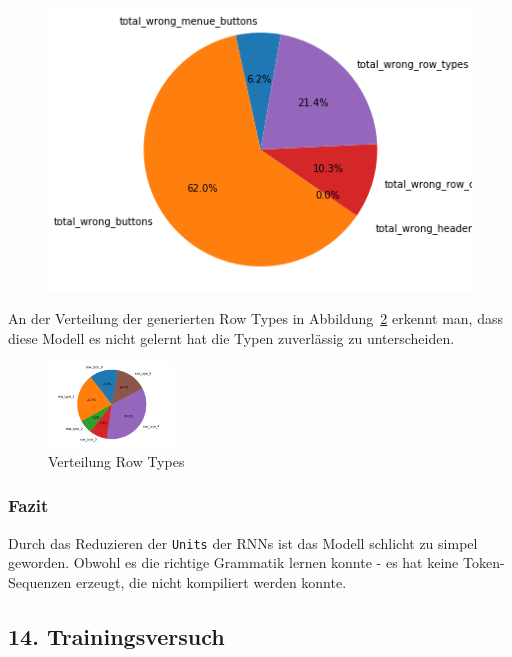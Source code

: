\documentclass[pdftex,a4paper,halfparskip, article]{scrartcl}
\begin{document}
\begin{figure}
\begin{minipage}{.33\textwidth}
  \label{fig:fehler_beste80_bin16}
\end{minipage}
\begin{minipage}{.33\textwidth}
  \centering
   \includegraphics[width=1\linewidth]{predictions_bin16_p80_error_types_pie_chart}
  \label{fig:fehler_schlechteste20_bin16}
\end{minipage}
\end{figure}

An der Verteilung der generierten Row Types in Abbildung~\ref{fig:bin16_row_type} erkennt man, dass diese Modell es nicht gelernt hat die Typen zuverlässig zu unterscheiden.

\begin{figure}[h]
\centering
\includegraphics[width=0.3\textwidth]{predictions_bin16_predicted_row_type_distribution}
\caption{Verteilung Row Types}
\label{fig:bin16_row_type}
\end{figure}

\subsubsection*{Fazit}
Durch das Reduzieren der \texttt{Units} der RNNs ist das Modell schlicht zu simpel geworden. Obwohl es die richtige Grammatik lernen konnte - es hat keine Token-Sequenzen erzeugt, die nicht kompiliert werden konnte.

\subsection{14. Trainingsversuch}
\end{document}
